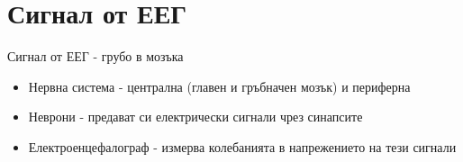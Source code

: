 \documentclass[9pt]{beamer}
\begin{document}
\section{Сигнал от ЕЕГ}
    \begin{frame}[t]{Сигнал от ЕЕГ - грубо в мозъка}
        \pause
        \begin{itemize}
            \setlength\itemsep{\fill}
            \pause
            \item Нервна система 
            \pause - централна (главен и гръбначен мозък) \pause и периферна
            \pause
            \item Неврони
            \pause - предават си електрически сигнали чрез синапсите
            \pause
            \item Електроенцефалограф
            \pause - измерва колебанията в напрежението на тези сигнали
        \end{itemize}
    \end{frame}
\end{document}
